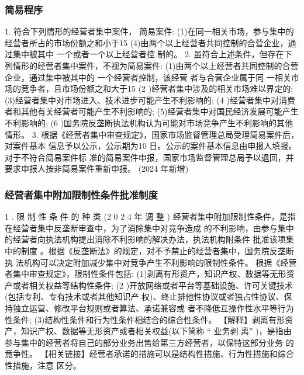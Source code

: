 \documentclass[UTF8,12pt]{ctexart}
\numberwithin{equation}{section} %
\numberwithin{figure}{section}
\numberwithin{table}{section}
\begin{document}
	\subsubsection{简易程序}
	1. 符合下列情形的经营者集中案件， 简易案件: (1)在同一相关市场，参与集中的经营者所占的市场份额之和小于15%
	(4)由两个以上经营者共同控制的合营企业，通过集中被其中 一个或者一个以上经营者控 制的。
	2. 虽符合上述条件，但存在下列情形的经营者集中案件，不视为简易案件: (1)由两个以上经营者共同控制的合营企业，通过集中被其中的 一个经营者控制，该经营 者与合营企业属于同 一相关市场的竞争者，且市场份额之和大于15%
	(2 )经营者集中涉及的相关市场难以界定的; (3)经营者集中对市场进入、技术进步可能产生不利影响的;
	(4 )经营者集中对消费者和其他有关经营者可能产生不利影响的; (5)经营者集中对国民经济发展可能产生不利影响的;
	(6 )国务院反垄断执法机构认为可能对市场竞争产生不利影响的其他情形。
	3. 根据《经营者集中审查规定》，国家市场监督管理总局受理简易案件后，对案件基本 信息予以公示，公示期为10 日。公示的案件基本信息由申报人填报。对于不符合简易案件标 准的简易案件申报，国家市场监督管理总局予以退回，并要求申报人按非简易案件重新申报。 (2024 年新增)
	
	\subsubsection{经营者集中附加限制性条件批准制度}
	1 . 限 制 性 条 件 的 种 类 (2 0 2 4 年 调 整 ) 经营者集中附加限制性条件，是指在经营者集中反垄断审查中，为了消除集中对竞争造成 的不利影响，由参与集中的经营者向执法机构提出消除不利影响的解决办法，执法机构附条件 批准该项集中的制度 。根据《反垄断法》的规定，对不予禁止的经营者集中，国务院反垄断执 法机构可以决定附加减少集中对竞争产生不利影响的限制性条件。 根据《经营者集中审查规定》，限制性条件包括: (1)剥离有形资产，知识产权、数据等无形资产或者相关权益等结构性条件;
	(2 )开放网络或者平台等基础设施、许可关键技术(包括专利、专有技术或者其他知识产 权)、终止排他性协议或者独占性协议、保持独立运营、修改平台规则或者算法、承诺兼容或 者不降低互操作性水平等行为性条件;
	(3)结构性条件和行为性条件相结合的综合性条件。
	【解释】剥离有形资产，知识产权、数据等无形资产或者相关权益(以下简称 “ 业务剥 离” )，是指由参与集中的经营者将自己的部分业务出售给第三方经营者，以保特这部分业务 的竟争性。
	【相关链接】经营者承诺的措施可以是结构性措施、行为性措施和综合性措施，注意 区分。
	
\end{document}
